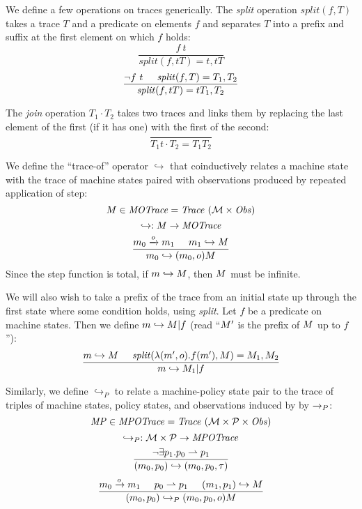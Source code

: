 \documentclass[acmsmall,review,anonymous]{acmart}\settopmatter{printfolios=true,printccs=false,printacmref=false}
\begin{document}
We define a few operations on traces generically.
The {\it split} operation \(\mathit{split}(f,T)\) takes a trace \(T\) and a predicate on elements \(f\) and
separates \(T\) into a prefix and suffix at the first element on which \(f\) holds:
  \[\frac{f\ t}
         {\mathit{split}(f,tT) = t, tT}\]
  \[\frac{\neg f\ t \hspace{.5cm} \mathit{split}(f,T) = T_1,T_2}
         {\mathit{split}(f,tT) = tT_1,T_2}\]

The {\it join} operation \(T_1 \cdot T_2\) takes two traces and links them by replacing the last element
of the first (if it has one) with the first of the second:
  \[\frac{}
         {T_1t \cdot T_2 = T_1 T_2}\]

We define the ``trace-of'' operator \(\hookrightarrow\) that coinductively
relates a machine state with the trace of machine states paired with
observations produced by repeated application of step:
\[M \in \mathit{MOTrace} = \mathit{Trace}\ ({\mathcal M} \times \mathit{Obs})\]
\[\hookrightarrow : M \rightarrow \mathit{MOTrace}\]
%
\[\frac{m_0 \xrightarrow{o} m_1 \hspace{.5cm} m_1 \hookrightarrow M}
       {m_0 \hookrightarrow (m_0,o) M}\]
%
Since the step function is total, if \(m \hookrightarrow M\),
then \(M\) must be infinite.

We will also wish to take a prefix of the trace from an initial state up through the first state where
some condition holds, using {\it split}. Let \(f\) be a predicate on machine states. Then we define
\(m \hookrightarrow M | f\) (read ``\(M'\) is the prefix of \(M\) up to \(f\)''):
  \[\frac{m \hookrightarrow M \hspace{.5cm} \mathit{split}(\lambda (m',o).f(m'),M)
            = M_1,M_2}
         {m \hookrightarrow M_1 | f}\]

Similarly, we define \(\hookrightarrow_P\) to relate a machine-policy
state pair to the trace of triples of machine states, policy states,
and observations induced by by \(\xrightarrow{}_P\):
%
  \[\MPT \in \mathit{MPOTrace} = \mathit{Trace}\ (\MACHS \times \POLS \times \OBSS)\]
  \[\hookrightarrow_P : {\mathcal M} \times \mathcal{P} \rightarrow \mathit{MPOTrace}\]
  \[\frac{\neg \exists p_1 . p_0 \rightharpoonup p_1}
         {(m_0,p_0) \hookrightarrow (m_0,p_0,\tau)}\]
  \[\frac{m_0 \xrightarrow{o} m_1 \hspace{.5cm} p_0 \rightharpoonup p_1 \hspace{.5cm}
            (m_1,p_1) \hookrightarrow M}
         {(m_0,p_0) \hookrightarrow_P (m_0,p_0,o) M}\]
\end{document}
